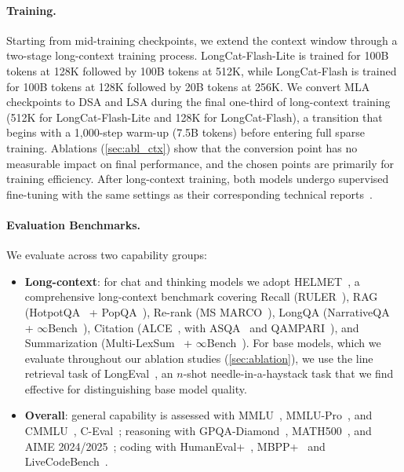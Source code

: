 \documentclass{article}
\newcommand{\longcat}{LongCat-Flash-Lite\xspace}
\begin{document}
\paragraph{Training.}
Starting from mid-training checkpoints, we extend the context window through a two-stage long-context training process. \longcat is trained for 100B tokens at 128K followed by 100B tokens at 512K, while LongCat-Flash is trained for 100B tokens at 128K followed by 20B tokens at 256K. We convert MLA checkpoints to DSA and LSA during the final one-third of long-context training (512K for \longcat and 128K for LongCat-Flash), a transition that begins with a 1,000-step warm-up (7.5B tokens) before entering full sparse training. Ablations (\cref{sec:abl_ctx}) show that the conversion point has no measurable impact on final performance, and the chosen points are primarily for training efficiency. After long-context training, both models undergo supervised fine-tuning with the same settings as their corresponding technical reports~\citep{liu2026scaling,team2025longcat}.

\paragraph{Evaluation Benchmarks.}
We evaluate across two capability groups:
\begin{itemize}
\item \textbf{Long-context}: for chat and thinking models we adopt HELMET~\citep{yen2024helmet}, a comprehensive long-context benchmark covering Recall (RULER~\citep{hsieh2024ruler}), RAG (HotpotQA~\citep{yang2018hotpotqa} + PopQA~\citep{mallen2023popqa}), Re-rank (MS MARCO~\citep{bajaj2016ms}), LongQA (NarrativeQA~\citep{kocisky2018narrativeqa} + $\infty$Bench~\citep{zhang2024infbench}), Citation (ALCE~\citep{gao2023alce}, with ASQA~\citep{stelmakh2022asqa} and QAMPARI~\citep{rubin2022qampari}), and Summarization (Multi-LexSum~\citep{shen2022multilexsum} + $\infty$Bench~\citep{zhang2024infbench}). For base models, which we evaluate throughout our ablation studies (\cref{sec:ablation}), we use the line retrieval task of LongEval~\citep{longchat2023}, an $n$-shot needle-in-a-haystack task that we find effective for distinguishing base model quality.
\item \textbf{Overall}: general capability is assessed with MMLU~\citep{hendrycks2021mmlu}, MMLU-Pro~\citep{wang2024mmlupro}, and CMMLU~\citep{li2023cmmlu}, C-Eval~\citep{huang2024ceval}; reasoning with GPQA-Diamond~\citep{rein2024gpqa}, MATH500~\citep{hendrycks2021math}, and AIME 2024/2025~\citep{aime2024,aime2025}; coding with HumanEval+~\citep{liu2023your}, MBPP+~\citep{liu2023your} and LiveCodeBench~\citep{jain2024livecodebench}.
\end{itemize}
\end{document}
